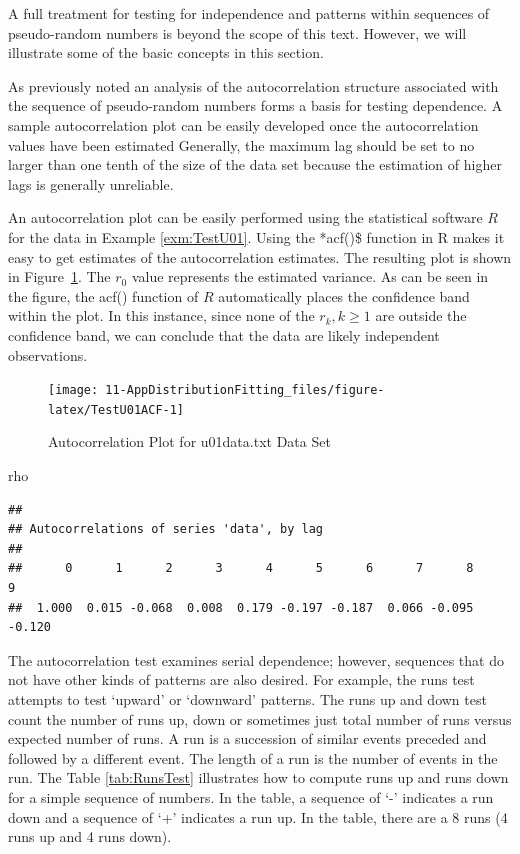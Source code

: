 \documentclass[
]{book}
\newenvironment{Shaded}{\begin{snugshade}}{\end{snugshade}}
\newcommand{\NormalTok}[1]{#1}
\theoremstyle{definition}
\theoremstyle{definition}
\theoremstyle{definition}
\theoremstyle{definition}
\theoremstyle{remark}
\begin{document}
A full treatment for testing for independence and patterns within sequences of pseudo-random numbers is beyond the scope of this text. However, we will illustrate some of the basic concepts in this section.

As previously noted an analysis of the autocorrelation structure associated with the sequence of pseudo-random numbers forms a basis for testing dependence. A sample autocorrelation plot can be easily developed once the
autocorrelation values have been estimated Generally, the maximum lag should
be set to no larger than one tenth of the size of the data set because
the estimation of higher lags is generally unreliable.

An autocorrelation plot can be easily performed using the statistical
software \(R\) for the data in Example \ref{exm:TestU01}. Using the *acf()\$ function in R makes it easy to get estimates of the autocorrelation estimates. The resulting plot is shown in
Figure~\ref{fig:TestU01ACF}. The \(r_{0}\) value represents the estimated
variance. As can be seen in the figure, the acf() function of \(R\)
automatically places the confidence band within the plot. In this
instance, since none of the \(r_{k}, k \geq 1\) are outside the confidence
band, we can conclude that the data are likely independent observations.

\begin{figure}

{\centering \texttt{[image: 11-AppDistributionFitting\_files/figure-latex/TestU01ACF-1]} 

}

\caption{Autocorrelation Plot for u01data.txt Data Set}\label{fig:TestU01ACF}
\end{figure}

\begin{Shaded}
\begin{Highlighting}[]
\NormalTok{rho}
\end{Highlighting}
\end{Shaded}

\begin{verbatim}
## 
## Autocorrelations of series 'data', by lag
## 
##      0      1      2      3      4      5      6      7      8      9 
##  1.000  0.015 -0.068  0.008  0.179 -0.197 -0.187  0.066 -0.095 -0.120
\end{verbatim}

The autocorrelation test examines serial dependence;
however, sequences that do not have other kinds of patterns are also
desired. For example, the runs test attempts to test `upward' or
`downward' patterns. The runs up and down test count the number of runs
up, down or sometimes just total number of runs versus expected number
of runs. A run is a succession of similar events preceded and followed
by a different event. The length of a run is the number of events in the
run. The Table \ref{tab:RunsTest} illustrates how to compute runs up and runs down
for a simple sequence of numbers. In the table, a sequence of `-'
indicates a run down and a sequence of `+' indicates a run up. In the
table, there are a 8 runs (4 runs up and 4 runs down).
\end{document}
